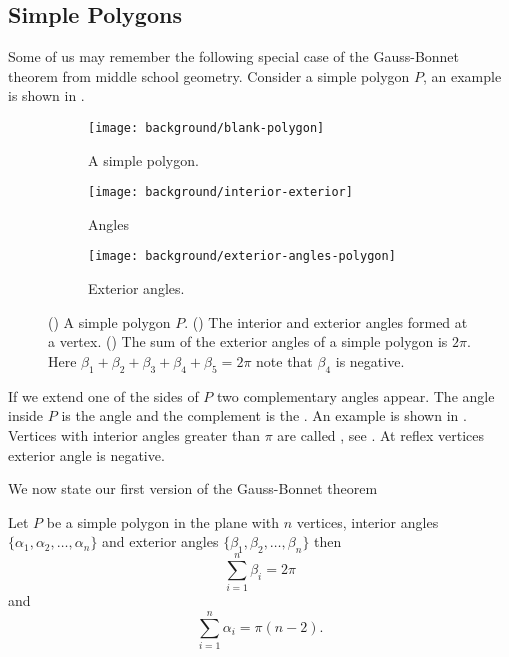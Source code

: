 \subsection{Simple Polygons}
\label{sec:warm-up}

Some of us may remember the following special case
of the Gauss-Bonnet theorem from middle school geometry.
Consider a simple polygon $P$, an example is shown in .

 \begin{figure}[htb]
         \centering
          \begin{subfigure}[b]{0.30\textwidth}
      		   \texttt{[image: background/blank-polygon]}
    		    \caption{A simple polygon.}
 		 \label{fig:polygon}
	 \end{subfigure}
	 \hspace{.5cm}
	 \begin{subfigure}[b]{0.25\textwidth}
       		  \texttt{[image: background/interior-exterior]}
     		    \caption{Angles}
 		 \label{fig:interior-exterior}
       \end{subfigure}
        \hspace{.5cm}
     \begin{subfigure}[b]{0.27\textwidth}
       		  \texttt{[image: background/exterior-angles-polygon]}
       		  \caption{Exterior angles.}
       		   \label{fig:exterior-angles}
         \end{subfigure}
		\caption{() A simple polygon $P.$
		() The interior and exterior angles formed at a vertex.
 		 () The sum of the exterior angles of a simple
		polygon is $2\pi$. Here
		$\beta_1+\beta_2+\beta_3+\beta_4+\beta_5=2\pi$ note that $\beta_4$ is negative.
 		\label{fig:simple-polygon}}
 \end{figure}

If we extend one of the sides of $P$ two complementary angles appear.
The angle inside $P$ is the  angle and the complement 
is the  . An example is shown in .
Vertices with interior angles  greater than $\pi$ are called , see . 
At reflex vertices exterior angle is negative.



We now state our first version of the Gauss-Bonnet theorem

\begin{theorem}\label{thm:simple-bonnet}
Let $P$ be a simple polygon in the plane with $n$  vertices,
interior angles $\{\alpha_1,\alpha_2,\ldots,\alpha_n\}$
and exterior angles $\{\beta_1,\beta_2,\ldots,\beta_n\}$ then
$$\sum_{i=1}^n\beta_i=2\pi$$
and 
$$\sum_{i=1}^n\alpha_i=\pi(n-2).$$
\end{theorem}


